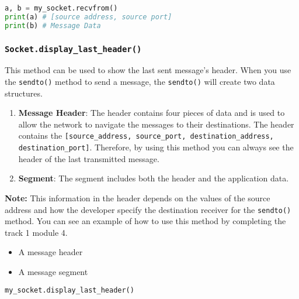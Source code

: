 \documentclass[11pt]{article}
\begin{document}
\begin{lstlisting}[caption={Example for using \texttt{recvfrom()}}, language=Python]
a, b = my_socket.recvfrom()
print(a) # [source address, source port]
print(b) # Message Data
\end{lstlisting}

\subsubsection{\texttt{Socket.\textbf{display\_last\_header()}}}
This method can be used to show the last sent message's header. When you use the \texttt{sendto()} method to send a message, the \texttt{sendto()} will create two data structures.
\begin{enumerate}
    \item \textbf{Message Header}: The header contains four pieces of data and is used to allow the network to navigate the messages to their destinations. The header contains the \texttt{[source\_address, source\_port, destination\_address, destination\_port]}. Therefore, by using this method you can always see the header of the last transmitted message.
    \item \textbf{Segment}: The segment includes both the header and the application data. 
\end{enumerate}

\textbf{Note:}
This information in the header depends on the values of the source address and how the developer specify the destination receiver for the \texttt{sendto()} method. You can see an example of how to use this method by completing the track 1 module 4.

\begin{itemize}
    \item A message header

    \item A message segment
\end{itemize}

\begin{lstlisting}[caption={Example for using \texttt{display\_last\_header()}}, language=Python]
my_socket.display_last_header()
\end{lstlisting}
\end{document}
